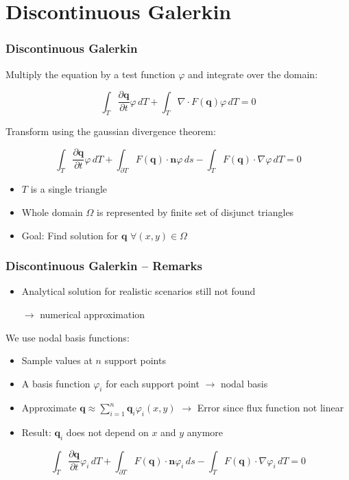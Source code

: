 \documentclass{beamer}
\newcommand{\todo}[1]{
  \textcolor{red}{TODO: #1}
  \note{\textcolor{red}{TODO: #1}}
}
\renewcommand{\todo}[1]{}
\newcommand{\pd}[2]{\dfrac{\partial #1}{\partial #2}}
\renewcommand{\phi}{\varphi}
\begin{document}
\section{Discontinuous Galerkin}
\label{sec:basis-functions-intro}

\begin{frame}
  \frametitle{Discontinuous Galerkin}
  Multiply the equation by a test function $\phi$ and integrate over the domain:
  
  \begin{equation}
    \label{eq:shallow-water-weak-form}
    \int_T \pd {\mathbf{q}}{t} \phi \, dT + \int_T \nabla \cdot F(\mathbf{q}) \phi \, dT = 0
  \end{equation}

  Transform using the gaussian divergence theorem:

  \begin{equation}
    \label{eq:shallow-water-dg}
    \int_T \pd {\mathbf{q}}{t} \phi \, dT +
    \int_{\partial T} F(\mathbf{q}) \cdot \mathbf{n} \phi \, ds -
    \int_T F(\mathbf{q}) \cdot \nabla \phi \, dT = 0
  \end{equation}
  
  \begin{itemize}
  \item $T$ is a single triangle
  \item Whole domain $\Omega$ is represented by finite set of disjunct triangles
  \item Goal: Find solution for $\mathbf{q}$ $\forall \left(x,y\right) \in \Omega$
  \end{itemize}

\end{frame}

\begin{frame}
  \frametitle{Discontinuous Galerkin -- Remarks}
  \begin{itemize}
  \item Analytical solution for realistic scenarios still not found

    $\rightarrow$ numerical approximation
  \end{itemize}
  We use nodal basis functions:
  \begin{itemize}  
  \item Sample values at $n$ support points
  \item A basis function $\phi_i$ for each support point $\rightarrow$ nodal basis
  \item Approximate 
    $\mathbf{q} \approx \sum_{i=1}^n \mathbf{q}_i \phi_i(x,y)$ $\rightarrow$ Error since flux function not linear \todo{Correct?}
  \item Result: $\mathbf{q}_i$ does not depend on $x$ and $y$ anymore
  \end{itemize}

  \begin{equation}
    \label{eq:shallow-water-phi-i}
    \int_T \pd {\mathbf{q}}{t} \phi_i \, dT +
    \int_{\partial T} F(\mathbf{q}) \cdot \mathbf{n} \phi_i \, ds -
    \int_T F(\mathbf{q}) \cdot \nabla \phi_i \, dT = 0
  \end{equation}
\end{frame}
\end{document}
